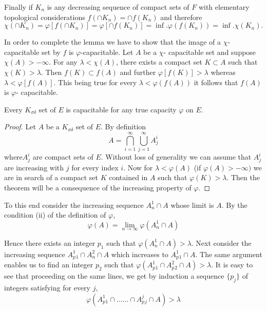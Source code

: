 Finally if $K_n$ is any decreasing sequence of compact sets of $F$
with elementary topological considerations $f(\cap K_n) = \cap f(K_n)$
and therefore  
$$
\chi (\cap K_n) = \varphi[f(\cap K_n)] = \varphi[\cap f(K_n)] =
\inf.\varphi(f(K_n)) = \inf. \chi (K_n). 
$$

In order to complete the lemma we have to show that the image of a
$\chi$-capacitable set by $f$ is $\varphi$-capacitable. Let $A$ be a
$\chi$- capacitable set and suppose $\chi (A) > - \infty$. For any
$\lambda < \chi (A)$, there exists a compact set $K \subset A$ such
that $\chi(K) > \lambda$. Then $f(K) \subset f(A)$ and further
$\varphi[f(K)]> \lambda$ whereas $\lambda < \varphi [ f(A)]$. This
being true for every $\lambda < \varphi (f(A))$ it follows that $f(A)$
is $\varphi$- capacitable. 

\begin{Lemma}\label{p2:chap1:sec1:lem2}%
  Every $K_{\sigma \delta}$ set of $E$ is capacitable for any true
  capacity $\varphi$ on $E$. 
\end{Lemma}  

\begin{proof} %
  Let $A$ be a $K_{\sigma \delta}$  set of $E$. By definition 
  $$
  A = \bigcap^{\infty}_{i=1} \bigcup^{\infty}_{j=1} A^i_j
  $$
  where\pageoriginale $A^i_j$ are compact sets of $E$. Without loss of generality we
  can assume that $A^i_j$ are increasing with $j$ for every index
  $i$. Now for $\lambda < \varphi (A)$ (if $\varphi(A) > - \infty)$ we
  are in search of a compact set $K$ contained in $A$ such that
  $\varphi (K) > \lambda$. Then the theorem will be a consequence of
  the increasing property of $\varphi$. 
\end{proof}

To this end consider the increasing sequence $A^1_n \cap A$ whose limit
is $A$. By the condition (ii) of the definition of $\varphi$, 
$$
\varphi(A) = \lim_{n \to \infty} \varphi (A^1_n \cap A)
$$

Hence there exists an integer $p_1$ such that $ \varphi (A^1_n \cap A)
> \lambda$. Next consider the increasing sequence $A^1_p{_1} \cap
A^2_n \cap A$ which increases to $A^1_p{_1} \cap A$. The same argument
enables us to find an integer $p_2$ such that $\varphi(A^1_p{_1} \cap
A^2_p{_2} \cap A)> \lambda$. It is easy to see that proceeding on the
same lines, we get by induction a sequence $\{ p_j \}$ of integers
satisfying for every $j$, 
$$
\varphi(A^1_p{_1} \cap \ldots \ldots \cap A^j_p{_j} \cap A) > \lambda
$$

